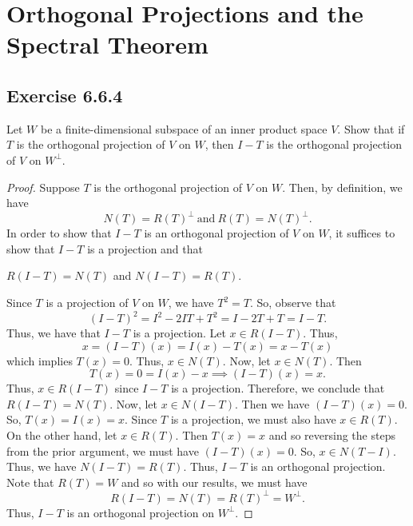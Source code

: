 \section{Orthogonal Projections and the Spectral Theorem}

\subsection*{Exercise 6.6.4} Let \( W  \) be a finite-dimensional subspace of an inner product space \( V  \). Show that if \( T  \) is the orthogonal projection of \( V  \) on \( W  \), then \( I - T  \) is the orthogonal projection of \( V  \) on \( W^{\perp} \).
\begin{proof}
Suppose \( T  \) is the orthogonal projection of \( V  \) on \( W  \). Then, by definition, we have
\[  N(T) = R(T)^{\perp} \ \text{and} \ R(T) = N(T)^{\perp}. \] 
In order to show that \( I - T  \) is an orthogonal projection of \( V  \) on \( W  \), it suffices to show that \( I -T  \) is a projection and that 
\begin{center}
    \( R(I - T) = N(T) \) and \( N(I - T) = R(T) \).
\end{center}
Since \( T  \) is a projection of \( V  \) on \( W  \), we have \( T^{2} = T  \). So, observe that 
\[  (I-T)^{2} = I^{2} - 2IT + T^{2} = I - 2T + T = I -T.  \]
Thus, we have that \( I - T  \) is a projection. Let \( x \in R(I - T) \). Thus,  
\[  x = (I - T)(x) = I(x) - T(x) = x - T(x)  \]
which implies \( T(x) = 0  \). Thus, \( x \in N(T) \). Now, let \( x \in N(T) \). Then
\[  T(x) = 0 = I(x) - x \implies (I - T)(x) = x.  \]
Thus, \( x \in R(I -T)  \) since \( I - T  \) is a projection. Therefore, we conclude that \( R(I -T) = N(T) \). Now, let \( x \in N(I -T) \). Then we have \( (I - T)(x) = 0  \). So, \( T(x) = I(x) = x  \). Since \( T  \) is a projection, we must also have \(  x \in R(T)  \). On the other hand, let \( x \in R(T) \). Then \( T(x) = x   \) and so reversing the steps from the prior argument, we must have \( (I -T)(x) = 0  \). So, \( x \in N(T - I) \). Thus, we have \( N(I -T) = R(T) \). Thus, \( I -T   \) is an orthogonal projection. Note that \( R(T) = W  \) and so with our results, we must have
\[  R(I - T) = N(T) = R(T)^{\perp} = W^{\perp}. \]
Thus, \( I - T  \) is an orthogonal projection on \( W^{\perp} \).
\end{proof}

